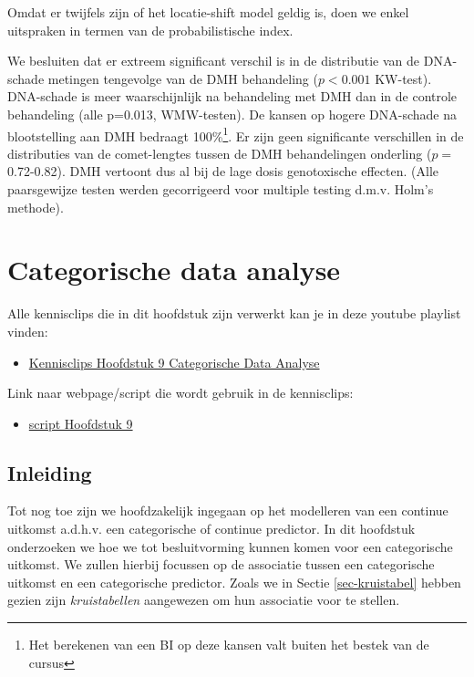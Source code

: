 \documentclass[
  dutch,
  letterpaper,
  12pt]{book}
\providecommand{\tightlist}{%
  \setlength{\itemsep}{0pt}\setlength{\parskip}{0pt}}
\theoremstyle{definition}
\theoremstyle{definition}
\theoremstyle{definition}
\theoremstyle{remark}
\begin{document}
Omdat er twijfels zijn of het locatie-shift model geldig is, doen we
enkel uitspraken in termen van de probabilistische index.

We besluiten dat er extreem significant verschil is in de distributie
van de DNA-schade metingen tengevolge van de DMH behandeling
(\(p<0.001\) KW-test). DNA-schade is meer waarschijnlijk na behandeling
met DMH dan in de controle behandeling (alle p=0.013, WMW-testen). De
kansen op hogere DNA-schade na blootstelling aan DMH bedraagt
100\%\footnote{Het berekenen van een BI op deze kansen valt buiten het
  bestek van de cursus}. Er zijn geen significante verschillen in de
distributies van de comet-lengtes tussen de DMH behandelingen onderling
(\(p=\) 0.72-0.82). DMH vertoont dus al bij de lage dosis genotoxische
effecten. (Alle paarsgewijze testen werden gecorrigeerd voor multiple
testing d.m.v. Holm's methode).


\chapter{Categorische data analyse}\label{sec-chap-categorisch}

Alle kennisclips die in dit hoofdstuk zijn verwerkt kan je in deze
youtube playlist vinden:

\begin{itemize}
\tightlist
\item
  \href{https://www.youtube.com/playlist?list=PLZH1hP8_LbJJnNyz6IMPqq6fCMZJ63y8x}{Kennisclips
  Hoofdstuk 9 Categorische Data Analyse}
\end{itemize}

Link naar webpage/script die wordt gebruik in de kennisclips:

\begin{itemize}
\tightlist
\item
  \href{https://statomics.github.io/sbc/rmd/09-categoricalDataAnalysis.html}{script
  Hoofdstuk 9}
\end{itemize}

\section{Inleiding}\label{inleiding-8}

Tot nog toe zijn we hoofdzakelijk ingegaan op het modelleren van een
continue uitkomst a.d.h.v. een categorische of continue predictor. In
dit hoofdstuk onderzoeken we hoe we tot besluitvorming kunnen komen voor
een categorische uitkomst. We zullen hierbij focussen op de associatie
tussen een categorische uitkomst en een categorische predictor. Zoals we
in Sectie \ref{sec-kruistabel} hebben gezien zijn \emph{kruistabellen}
aangewezen om hun associatie voor te stellen.
\end{document}
